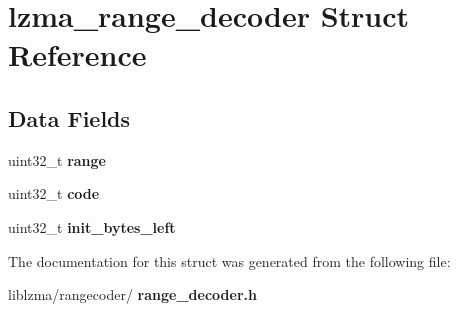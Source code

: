 \section{lzma\+\_\+range\+\_\+decoder Struct Reference}
\label{structlzma__range__decoder}
\subsection*{Data Fields}
\begin{DoxyCompactItemize}
\item 
\mbox{\label{structlzma__range__decoder_ae6d66f625c8e177a0f50e65186201816}} 
uint32\+\_\+t {\bfseries range}
\item 
\mbox{\label{structlzma__range__decoder_af35718564faa62de08a0216c438f8360}} 
uint32\+\_\+t {\bfseries code}
\item 
\mbox{\label{structlzma__range__decoder_ac630830e86260478cf270756e6dd266a}} 
uint32\+\_\+t {\bfseries init\+\_\+bytes\+\_\+left}
\end{DoxyCompactItemize}


The documentation for this struct was generated from the following file\+:\begin{DoxyCompactItemize}
\item 
liblzma/rangecoder/\textbf{ range\+\_\+decoder.\+h}\end{DoxyCompactItemize}
